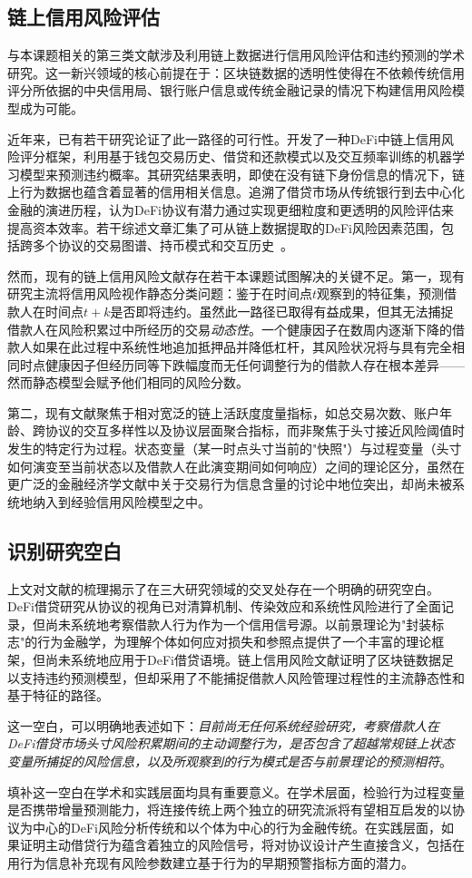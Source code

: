 \subsection{链上信用风险评估}

与本课题相关的第三类文献涉及利用链上数据进行信用风险评估和违约预测的学术研究。这一新兴领域的核心前提在于：区块链数据的透明性使得在不依赖传统信用评分所依据的中央信用局、银行账户信息或传统金融记录的情况下构建信用风险模型成为可能。

近年来，已有若干研究论证了此一路径的可行性。\citet{ghosh2024onchain}开发了一种DeFi中链上信用风险评分框架，利用基于钱包交易历史、借贷和还款模式以及交互频率训练的机器学习模型来预测违约概率。其研究结果表明，即使在没有链下身份信息的情况下，链上行为数据也蕴含着显著的信用相关信息。\citet{xu2021banks}追溯了借贷市场从传统银行到去中心化金融的演进历程，认为DeFi协议有潜力通过实现更细粒度和更透明的风险评估来提高资本效率。若干综述文章汇集了可从链上数据提取的DeFi风险因素范围，包括跨多个协议的交易图谱、持币模式和交互历史~\cite{werner2022sok, jiang2023defi}。

然而，现有的链上信用风险文献存在若干本课题试图解决的关键不足。第一，现有研究主流将信用风险视作静态分类问题：鉴于在时间点\(t\)观察到的特征集，预测借款人在时间点\(t+k\)是否即将违约。虽然此一路径已取得有益成果，但其无法捕捉借款人在风险积累过中所经历的交易\emph{动态性}。一个健康因子在数周内逐渐下降的借款人如果在此过程中系统性地追加抵押品并降低杠杆，其风险状况将与具有完全相同时点健康因子但经历同等下跌幅度而无任何调整行为的借款人存在根本差异——然而静态模型会赋予他们相同的风险分数。

第二，现有文献聚焦于相对宽泛的链上活跃度度量指标，如总交易次数、账户年龄、跨协议的交互多样性以及协议层面聚合指标，而非聚焦于头寸接近风险阈值时发生的特定行为过程。状态变量（某一时点头寸当前的"快照"）与过程变量（头寸如何演变至当前状态以及借款人在此演变期间如何响应）之间的理论区分，虽然在更广泛的金融经济学文献中关于交易行为信息含量的讨论中地位突出，却尚未被系统地纳入到经验信用风险模型之中。

\subsection{识别研究空白}

上文对文献的梳理揭示了在三大研究领域的交叉处存在一个明确的研究空白。DeFi借贷研究从协议的视角已对清算机制、传染效应和系统性风险进行了全面记录，但尚未系统地考察借款人行为作为一个信用信号源。以前景理论为"封装标志"的行为金融学，为理解个体如何应对损失和参照点提供了一个丰富的理论框架，但尚未系统地应用于DeFi借贷语境。链上信用风险文献证明了区块链数据足以支持违约预测模型，但却采用了不能捕捉借款人风险管理过程性的主流静态性和基于特征的路径。

这一空白，可以明确地表述如下：\emph{目前尚无任何系统经验研究，考察借款人在DeFi借贷市场头寸风险积累期间的主动调整行为，是否包含了超越常规链上状态变量所捕捉的风险信息，以及所观察到的行为模式是否与前景理论的预测相符}。

填补这一空白在学术和实践层面均具有重要意义。在学术层面，检验行为过程变量是否携带增量预测能力，将连接传统上两个独立的研究流派将有望相互启发的以协议为中心的DeFi风险分析传统和以个体为中心的行为金融传统。在实践层面，如果证明主动借贷行为蕴含着独立的风险信号，将对协议设计产生直接含义，包括在用行为信息补充现有风险参数建立基于行为的早期预警指标方面的潜力。
